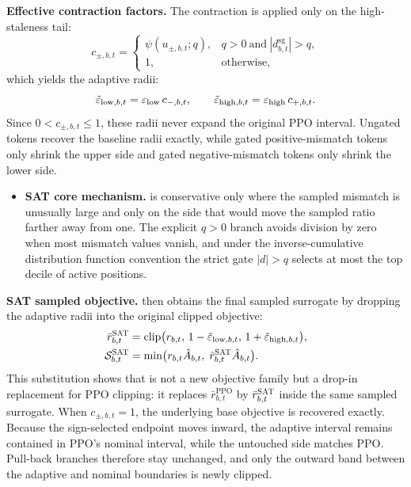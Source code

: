 \textbf{Effective contraction factors.} The contraction is applied only on the high-staleness tail:
\begin{equation}
c_{\pm,b,t}=
\begin{cases}
\psi(u_{\pm,b,t};q), & q>0\ \text{and}\ |d^{\mathrm{sg}}_{b,t}|>q,\\[2pt]
1, & \text{otherwise},
\end{cases}
\label{eq:gate}
\end{equation}
which yields the adaptive radii:
\begin{equation}
\tilde\varepsilon_{\mathrm{low},b,t}=\varepsilon_{\mathrm{low}}\,c_{-,b,t},
\qquad
\tilde\varepsilon_{\mathrm{high},b,t}=\varepsilon_{\mathrm{high}}\,c_{+,b,t}.
\label{eq:adaptive-eps}
\end{equation}
Since $0<c_{\pm,b,t}\le 1$, these radii never expand the original PPO interval. Ungated tokens recover the baseline radii exactly, while gated positive-mismatch tokens only shrink the upper side and gated negative-mismatch tokens only shrink the lower side.
\begin{itemize}
\item \textbf{SAT core mechanism.} \satr{} is conservative only where the sampled mismatch is unusually large and only on the side that would move the sampled ratio farther away from one. The explicit $q>0$ branch avoids division by zero when most mismatch values vanish, and under the inverse-cumulative distribution function convention the strict gate $|d|>q$ selects at most the top decile of active positions.
\end{itemize}

\textbf{SAT sampled objective.} \satr{} then obtains the final sampled surrogate by dropping the adaptive radii into the original clipped objective:
\begin{align}
\bar r^{\textsc{SAT}}_{b,t}&=\operatorname{clip}\!\big(r_{b,t},\,1-\tilde\varepsilon_{\mathrm{low},b,t},\,1+\tilde\varepsilon_{\mathrm{high},b,t}\big),
\label{eq:satr-clip}\\
\mathcal S^{\textsc{SAT}}_{b,t}&=\min\!\big(r_{b,t}\hat A_{b,t},\;\bar r^{\textsc{SAT}}_{b,t}\hat A_{b,t}\big).
\label{eq:satrloss}
\end{align}
This substitution shows that \satr{} is not a new objective family but a drop-in replacement for PPO clipping: it replaces $\bar r^{\mathrm{PPO}}_{b,t}$ by $\bar r^{\textsc{SAT}}_{b,t}$ inside the same sampled surrogate. When $c_{\pm,b,t}=1$, the underlying base objective is recovered exactly. Because the sign-selected endpoint moves inward, the adaptive interval remains contained in PPO's nominal interval, while the untouched side matches PPO. Pull-back branches therefore stay unchanged, and only the outward band between the adaptive and nominal boundaries is newly clipped.


